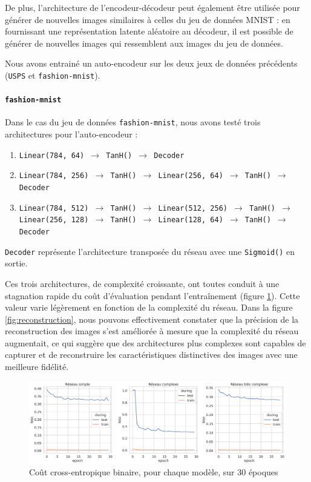 \documentclass{article}
\begin{document}
De plus, l'architecture de l'encodeur-décodeur peut également être utilisée pour générer de nouvelles images similaires à celles du jeu de données MNIST : en fournissant une représentation latente aléatoire au décodeur, il est possible de générer de nouvelles images qui ressemblent aux images du jeu de données.

Nous avons entrainé un auto-encodeur sur les deux jeux de données précédents (\texttt{USPS} et \texttt{fashion-mnist}). 

\paragraph*{\texttt{fashion-mnist}}

Dans le cas du jeu de données \texttt{fashion-mnist}, nous avons testé trois architectures pour l'auto-encodeur :

\begin{enumerate}
    \item \texttt{Linear(784, 64) $\rightarrow$ TanH() $\rightarrow$ Decoder}
    \item \texttt{Linear(784, 256) $\rightarrow$ TanH() $\rightarrow$ Linear(256, 64) $\rightarrow$ TanH() $\rightarrow$ Decoder}
    \item \texttt{Linear(784, 512) $\rightarrow$ TanH() $\rightarrow$ Linear(512, 256) $\rightarrow$ TanH() $\rightarrow$ Linear(256, 128) $\rightarrow$ TanH() $\rightarrow$ Linear(128, 64) $\rightarrow$ TanH() $\rightarrow$ Decoder}
\end{enumerate}

\texttt{Decoder} représente l'architecture transposée du réseau avec une \texttt{Sigmoid()} en sortie. 

Ces trois architectures, de complexité croissante, ont toutes conduit à une stagnation rapide du coût d'évaluation pendant l'entraînement (figure \ref{fig:lossencoder}). Cette valeur varie légèrement en fonction de la complexité du réseau. Dans la figure \ref{fig:reconstruction}, nous pouvons effectivement constater que la précision de la reconstruction des images s'est améliorée à mesure que la complexité du réseau augmentait, ce qui suggère que des architectures plus complexes sont capables de capturer et de reconstruire les caractéristiques distinctives des images avec une meilleure fidélité.

\begin{figure}[htbp]
    \centering
    \includegraphics*[width=.75\textwidth]{loss_encoder_fashion_3_networks.pdf}
    \caption{Coût cross-entropique binaire, pour chaque modèle, sur 30 époques}
    \label{fig:lossencoder}
\end{figure}
\end{document}
